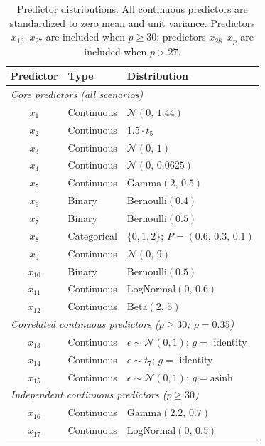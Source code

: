 \documentclass[11pt]{article}
\theoremstyle{plain}
\theoremstyle{definition}
\theoremstyle{remark}
\begin{document}
\begin{table}[ht!]
	\centering
	\small
	\caption{Predictor distributions. All continuous predictors are standardized to zero mean and unit variance. Predictors $x_{13}$--$x_{27}$ are included when $p \geq 30$; predictors $x_{28}$--$x_p$ are included when $p > 27$.}
	\label{tab:predictors}
	\begin{tabular}{cll}
		\hline
		Predictor & Type & Distribution \\
		\hline
		\multicolumn{3}{l}{\textit{Core predictors (all scenarios)}} \\[2pt]
		$x_1$    & Continuous   & $\mathcal{N}(0,\, 1.44)$ \\
		$x_2$    & Continuous   & $1.5 \cdot t_5$ \\
		$x_3$    & Continuous   & $\mathcal{N}(0,\, 1)$ \\
		$x_4$    & Continuous   & $\mathcal{N}(0,\, 0.0625)$ \\
		$x_5$    & Continuous   & $\mathrm{Gamma}(2,\, 0.5)$ \\
		$x_6$    & Binary       & $\mathrm{Bernoulli}(0.4)$ \\
		$x_7$    & Binary       & $\mathrm{Bernoulli}(0.5)$ \\
		$x_8$    & Categorical  & $\{0,1,2\}$;\; $P = (0.6,\, 0.3,\, 0.1)$ \\
		$x_9$    & Continuous   & $\mathcal{N}(0,\, 9)$ \\
		$x_{10}$ & Binary       & $\mathrm{Bernoulli}(0.5)$ \\
		$x_{11}$ & Continuous   & $\mathrm{LogNormal}(0,\, 0.6)$ \\
		$x_{12}$ & Continuous   & $\mathrm{Beta}(2,\, 5)$ \\[4pt]
		\multicolumn{3}{l}{\textit{Correlated continuous predictors ($p \geq 30$; $\rho = 0.35$)}} \\[2pt]
		$x_{13}$ & Continuous   & $\epsilon \sim \mathcal{N}(0,1)$;\; $g = $ identity \\
		$x_{14}$ & Continuous   & $\epsilon \sim t_7$;\; $g = $ identity \\
		$x_{15}$ & Continuous   & $\epsilon \sim \mathcal{N}(0,1)$;\; $g = \mathrm{asinh}$ \\[4pt]
		\multicolumn{3}{l}{\textit{Independent continuous predictors ($p \geq 30$)}} \\[2pt]
		$x_{16}$ & Continuous   & $\mathrm{Gamma}(2.2,\, 0.7)$ \\
		$x_{17}$ & Continuous   & $\mathrm{LogNormal}(0,\, 0.5)$ \\

\end{tabular}
\end{table}
\end{document}
